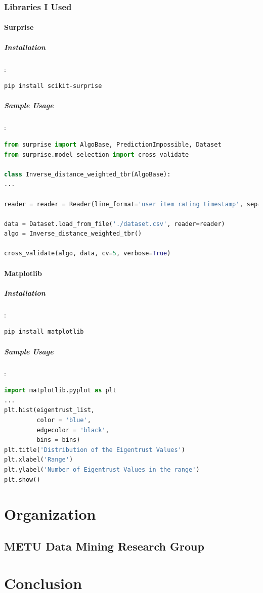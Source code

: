 \documentclass[12pt]{article}
\begin{document}
\subsubsection{Libraries I Used}
\paragraph{Surprise}
\subparagraph{Installation}:
\begin{lstlisting}[language=bash]
 pip install scikit-surprise
\end{lstlisting}

\subparagraph{Sample Usage}:
\begin{lstlisting}[language=python, caption=Surprise example]
from surprise import AlgoBase, PredictionImpossible, Dataset
from surprise.model_selection import cross_validate

class Inverse_distance_weighted_tbr(AlgoBase):
...

reader = reader = Reader(line_format='user item rating timestamp', sep=';', rating_scale=(1, 5))

data = Dataset.load_from_file('./dataset.csv', reader=reader)
algo = Inverse_distance_weighted_tbr()

cross_validate(algo, data, cv=5, verbose=True)
\end{lstlisting}

\paragraph{Matplotlib}
\subparagraph{Installation}:
\begin{lstlisting}[language=bash]
pip install matplotlib
\end{lstlisting}

\subparagraph{Sample Usage}:
\begin{lstlisting}[language=python, caption=Matplotlib example]
import matplotlib.pyplot as plt
...
plt.hist(eigentrust_list, 
		 color = 'blue', 
		 edgecolor = 'black',
		 bins = bins)
plt.title('Distribution of the Eigentrust Values')
plt.xlabel('Range')
plt.ylabel('Number of Eigentrust Values in the range')
plt.show() 
\end{lstlisting}

\section{Organization}
\subsection{METU Data Mining Research Group}

\section{Conclusion}



\end{document}

